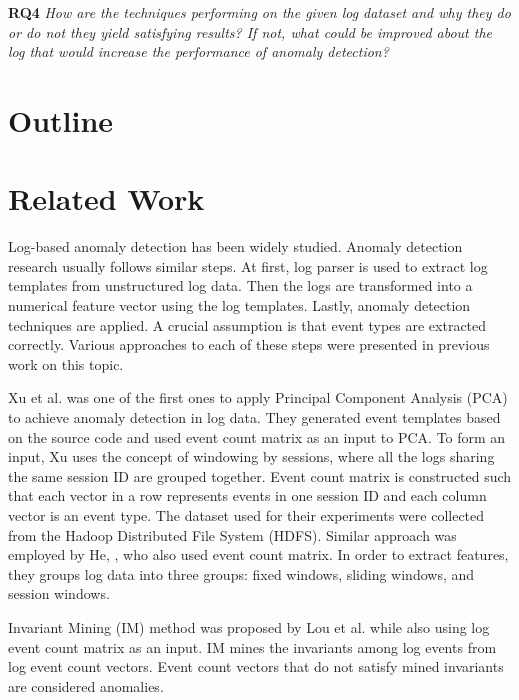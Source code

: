 \textbf{RQ4} \textit{How are the techniques performing on the given log dataset and why they do or do not they yield satisfying results? If not, what could be improved about the log that would increase the performance of anomaly detection?}\\ 
    

\section{Outline}

\section{Related Work}
Log-based anomaly detection has been widely studied. Anomaly detection research usually follows similar steps. At first, log parser is used to extract log templates from unstructured log data. Then the logs are transformed into a numerical feature vector using the log templates. Lastly, anomaly detection techniques are applied. A crucial assumption is that event types are extracted correctly. Various approaches to each of these steps were presented in previous work on this topic. 

Xu et al. \cite{xu2009} was one of the first ones to apply Principal Component Analysis (PCA) to achieve anomaly detection in log data. They generated event templates based on the source code and used event count matrix as an input to PCA. To form an input, Xu uses the concept of windowing by sessions, where all the logs sharing the same session ID are grouped together. Event count matrix is constructed such that each vector in a row represents events in one session ID and each column vector is an event type. The dataset used for their experiments were collected from the Hadoop Distributed File System (HDFS).
Similar approach was employed by He, \cite{he2016}, who also used event count matrix. In order to extract features, they groups log data into three groups: fixed windows, sliding windows, and session windows. 

Invariant Mining (IM) method was proposed by Lou et al. \cite{lou2010} while also using log event count matrix as an input. IM mines the invariants among log events from log event count vectors. Event count vectors that do not satisfy mined invariants are considered anomalies. 

